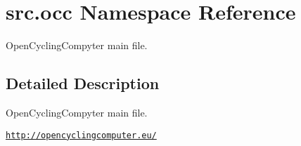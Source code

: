 \hypertarget{namespacesrc_1_1occ}{}\section{src.\+occ Namespace Reference}
\label{namespacesrc_1_1occ}


Open\+Cycling\+Compyter main file.  




\subsection{Detailed Description}
Open\+Cycling\+Compyter main file. 

\href{http://opencyclingcomputer.eu/}{\tt http\+://opencyclingcomputer.\+eu/} 